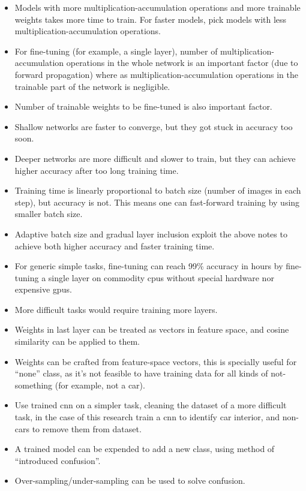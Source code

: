 \begin{itemize}
\item Models with more multiplication-accumulation operations and more trainable weights takes more time to train.
For faster models, pick models with less multiplication-accumulation operations.
\item For fine-tuning (for example, a single layer),
number of multiplication-accumulation operations in the whole network is an important factor (due to forward propagation)
where as multiplication-accumulation operations in the trainable part of the network is negligible.
\item Number of trainable weights to be fine-tuned is also important factor.
\item Shallow networks are faster to converge, but they got stuck in accuracy too soon.
\item Deeper networks are more difficult and slower to train, but they can achieve higher accuracy after too long training time.
\item Training time is linearly proportional to batch size (number of images in each step), but accuracy is not.
This means one can fast-forward training by using smaller batch size.
\item Adaptive batch size and gradual layer inclusion exploit the above notes to achieve both higher accuracy and faster training time.
\item For generic simple tasks, fine-tuning can reach 99\% accuracy in hours
by fine-tuning a single layer on commodity \glspl{cpu} without special hardware nor expensive \glspl{gpu}.
\item More difficult tasks would require training more layers.
\item Weights in last layer can be treated as vectors in feature space, and cosine similarity can be applied to them.
\item Weights can be crafted from feature-space vectors, this is specially useful for ``none'' class,
as it's not feasible to have training data for all kinds of not-something (for example, not a car).
\item Use trained \gls{cnn} on a simpler task, cleaning the dataset of a more difficult task,
in the case of this research train a \gls{cnn} to identify car interior, and non-cars to remove them from dataset.
\item A trained model can be expended to add a new class, using method of ``introduced confusion''.
\item Over-sampling/under-sampling can be used to solve confusion.
\end{itemize}

